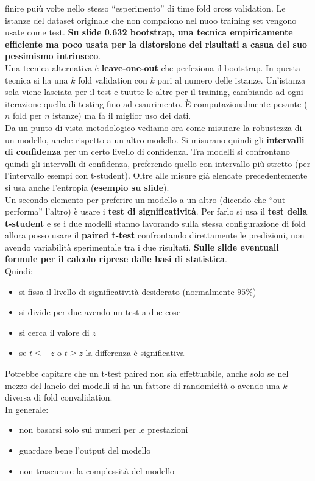 finire puiù volte nello stesso ``esperimento'' di time fold cross validation. Le
istanze del dataset originale che non compaiono nel nuoo training set vengono
usate come test. \textbf{Su slide 0.632 bootstrap, una tecnica empiricamente
  efficiente ma poco usata per la distorsione dei risultati a casua del suo
  pessimismo intrinseco}.\\
Una tecnica alternativa è \textbf{leave-one-out} che perfeziona il bootstrap. In
questa tecnica si ha una $k$ fold validation con $k$ pari al numero delle
istanze. Un'istanza sola viene lasciata per il test e tuutte le altre per il
training, cambiando ad ogni iterazione quella di testing fino ad esaurimento. È
computazionalmente pesante ($n$ fold per $n$ istanze) ma fa il miglior uso dei
dati. \\
Da un punto di vista metodologico vediamo ora come misurare la robustezza di un
modello, anche rispetto a un altro modello. Si misurano quindi gli
\textbf{intervalli di confidenza} per un certo livello di confidenza. Tra
modelli si confrontano quindi gli intervalli di confidenza, preferendo quello
con intervallo più stretto (per l'intervallo esempi con t-student). Oltre alle
misure già elencate precedentemente si 
usa anche l'entropia (\textbf{esempio su slide}).\\
Un secondo elemento per preferire un modello a un altro (dicendo che
``out-performa'' l'altro) è usare i \textbf{test di significatività}. Per farlo
si usa il \textbf{test della t-student} e se i due modelli stanno lavorando
sulla stessa configurazione di fold allora posso usare il \textbf{paired t-test}
confrontando direttamente le predizioni, non avendo variabilità sperimentale tra
i due risultati. \textbf{Sulle slide eventuali formule per il calcolo riprese
  dalle basi di statistica}.\\
Quindi:
\begin{itemize}
  \item si fissa il livello di significatività desiderato (normalmente $95\%$)
  \item si divide per due avendo un test a due cose
  \item si cerca il valore di $z$
  \item se $t\leq -z$ o $t\geq z$ la differenza è significativa
\end{itemize}
Potrebbe capitare che un t-test paired non sia effettuabile, anche solo se nel
mezzo del lancio dei modelli si ha un fattore di randomicità o avendo una $k$
diversa di fold convalidation.\\
In generale:
\begin{itemize}
  \item non basarsi solo sui numeri per le prestazioni
  \item guardare bene l'output del modello
  \item non trascurare la complessità del modello
\end{itemize}
